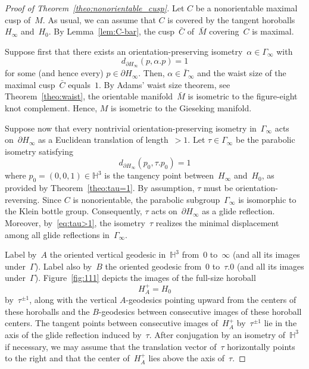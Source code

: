 \documentclass[11pt,reqno]{amsart}
\theoremstyle{definition}
\numberwithin{equation}{section}
\newcommand{\HH}{{\mathbb H}}
\numberwithin{equation}{section}
\begin{document}
\begin{proof}[Proof of Theorem~\ref{theo:nonorientable_cusp}]
Let $C$ be a nonorientable maximal cusp of~$M$.
As usual, we can assume that $C$ is covered by the tangent horoballs~$H_\infty$ and~$H_0$.
By Lemma~\ref{lem:C-bar}, the cusp~$\bar{C}$ of~$\bar{M}$ covering~$C$ is maximal. 

\medskip

Suppose first that there exists an orientation-preserving isometry~$\alpha \in \Gamma_\infty$ with
\[
d_{\partial H_\infty}(p,\alpha.p) = 1
\]
for some (and hence every) $p \in \partial H_\infty$.
Then, $\alpha \in \bar{\Gamma}_\infty$ and the waist size of the maximal cusp~$\bar{C}$ equals~$1$.
By Adams' waist size theorem, see Theorem~\ref{theo:waist}, the orientable manifold~$\bar{M}$ is isometric to the figure-eight knot complement.
Hence, $M$ is isometric to the Gieseking manifold. 

\medskip

Suppose now that every nontrivial orientation-preserving isometry in~$\Gamma_\infty$ acts on~$\partial H_\infty$ as a Euclidean translation of length~$>1$.
Let $\tau \in \Gamma_\infty$ be the parabolic isometry satisfying
\begin{equation*} %
d_{\partial H_\infty}(p_0,\tau.p_0) = 1
\end{equation*}
where $p_0=(0,0,1) \in \HH^3$ is the tangency point between~$H_\infty$ and~$H_0$, as provided by Theorem~\ref{theo:tau=1}.
By assumption, $\tau$ must be orientation-reversing.
Since $C$ is nonorientable, the parabolic subgroup~$\Gamma_\infty$ is isomorphic to the Klein bottle group.
Consequently, $\tau$ acts on~$\partial H_\infty$ as a glide reflection.
Moreover, by~\eqref{eq:tau>1}, the isometry~$\tau$ realizes the minimal displacement among all glide reflections in~$\Gamma_\infty$.

\medskip


Label by~$A$ the oriented vertical geodesic in~$\HH^3$ from~$0$ to~$\infty$ (and all its images under~$\Gamma$).
Label also by~$B$ the oriented geodesic from~$0$ to~$\tau.0$ (and all its images under~$\Gamma$).
Figure~\ref{fig:111} depicts the images of the  full-size horoball 
\[
H_A^+=H_0
\]
by~$\tau^{\pm 1}$, along with the vertical $A$-geodesics pointing upward from the centers of these horoballs and the $B$-geodesics between consecutive images of these horoball centers. 
The tangent points between consecutive images of~$H_A^+$ by~$\tau^{\pm 1}$ lie in the axis of the glide reflection induced by~$\tau$.
After conjugation by an isometry of~$\HH^3$ if necessary, we may assume that the translation vector of~$\tau$ horizontally points to the right and that the center of~$H_A^+$ lies above the axis of~$\tau$. 


\end{proof}
\end{document}
